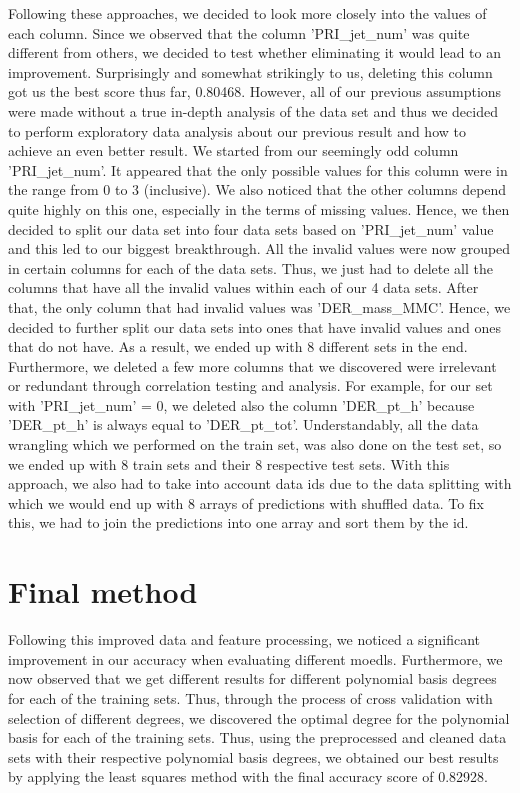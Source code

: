 \documentclass[10pt,conference,compsocconf]{IEEEtran}
\begin{document}
Following these approaches, we decided to look more closely into the values of each column. Since we observed that the column 'PRI\_jet\_num' was quite different from others, we decided to test whether eliminating it would lead to an improvement. Surprisingly and somewhat strikingly to us, deleting this column got us the best score thus far, 0.80468. However, all of our previous assumptions were made without a true in-depth analysis of the data set and thus we decided to perform exploratory data analysis about our previous result and how to achieve an even better result. We started from our seemingly odd column 'PRI\_jet\_num'. It appeared that the only possible values for this column were in the range from 0 to 3 (inclusive). We also noticed that the other columns depend quite highly on this one, especially in the terms of missing values. Hence, we then decided to split our data set into four data sets based on 'PRI\_jet\_num' value and this led to our biggest breakthrough. All the invalid values were now grouped in certain columns for each of the data sets. Thus, we just had to delete all the columns that have all the invalid values within each of our 4 data sets. After that, the only column that had invalid values was 'DER\_mass\_MMC'. Hence, we decided to further split our data sets into ones that have invalid values and ones that do not have. As a result, we ended up with 8 different sets in the end. Furthermore, we deleted a few more columns that we discovered were irrelevant or redundant through correlation testing and analysis. For example, for our set with 'PRI\_jet\_num' = 0, we deleted also the column 'DER\_pt\_h' because 'DER\_pt\_h' is always equal to 'DER\_pt\_tot'. Understandably, all the data wrangling which we performed on the train set, was also done on the test set, so we ended up with 8 train sets and their 8 respective test sets. With this approach, we also had to take into account data ids due to the data splitting with which we would end up with 8 arrays of predictions with shuffled data. To fix this, we had to join the predictions into one array and sort them by the id.

\section{Final method}

Following this improved data and feature processing, we noticed a significant improvement in our accuracy when evaluating different moedls. Furthermore, we now observed that we get different results for different polynomial basis degrees for each of the training sets. Thus, through the process of cross validation with selection of different degrees, we discovered the optimal degree for the polynomial basis for each of the training sets. Thus, using the preprocessed and cleaned data sets with their respective polynomial basis degrees, we obtained our best results by applying the least squares method with the final accuracy score of 0.82928.
\end{document}
